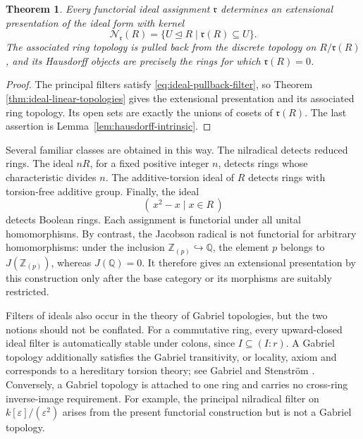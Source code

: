 \documentclass[12pt,oneside,reqno]{amsart}
\newtheorem{theorem}{Theorem}[section]
\theoremstyle{definition}
\theoremstyle{remark}
\begin{document}
\begin{theorem}\label{thm:functorial-ideal-topology}
Every functorial ideal assignment \(\mathfrak r\) determines an
extensional presentation of the ideal form with kernel
\[
 \mathcal N_{\mathfrak r}(R)
   =\{U\trianglelefteq R\mid\mathfrak r(R)\subseteq U\}.
\]
The associated ring topology is pulled back from the discrete topology
on \(R/\mathfrak r(R)\), and its Hausdorff objects are precisely the
rings for which \(\mathfrak r(R)=0\).
\end{theorem}

\begin{proof}
The principal filters satisfy
\eqref{eq:ideal-pullback-filter}, so Theorem
\ref{thm:ideal-linear-topologies} gives the extensional presentation
and its associated ring topology.  Its open sets
are exactly the unions of cosets of \(\mathfrak r(R)\).  The last
assertion is Lemma~\ref{lem:hausdorff-intrinsic}.
\end{proof}

Several familiar classes are obtained in this way.  The nilradical
detects reduced rings.  The ideal \(nR\), for a fixed positive integer
\(n\), detects rings whose characteristic divides \(n\).  The
additive-torsion ideal of \(R\) detects rings with
torsion-free additive group.  Finally, the ideal
\[
                    (\,x^2-x\mid x\in R\,)
\]
detects Boolean rings.  Each assignment is functorial under all unital
homomorphisms.  By contrast, the Jacobson radical is not functorial for
arbitrary homomorphisms: under the inclusion
\(\mathbb Z_{(p)}\hookrightarrow\mathbb Q\), the element \(p\) belongs
to \(J(\mathbb Z_{(p)})\), whereas \(J(\mathbb Q)=0\).  It therefore
gives an extensional presentation by this construction only after the
base category or
its morphisms are suitably restricted.

Filters of ideals also occur in the theory of Gabriel topologies, but
the two notions should not be conflated.  For a commutative ring, every
upward-closed ideal filter is automatically stable under colons, since
\(I\subseteq(I:r)\).  A Gabriel topology additionally satisfies the
Gabriel transitivity, or locality, axiom and corresponds to a
hereditary torsion theory; see Gabriel \cite{Gabriel} and Stenstr\"om
\cite{Stenstrom}.  Conversely, a Gabriel topology is attached to one
ring and carries no cross-ring inverse-image requirement.  For example,
the principal nilradical filter on
\(k[\varepsilon]/(\varepsilon^2)\) arises from the present functorial
construction but is not a Gabriel topology.
\end{document}
